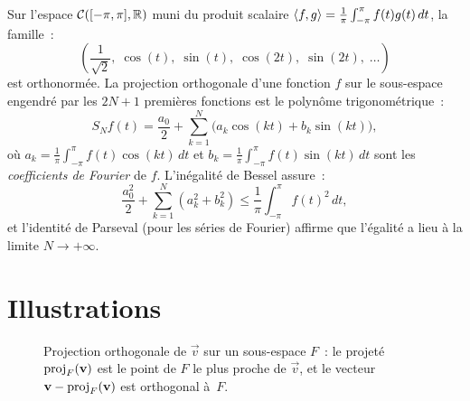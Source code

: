 Sur l'espace $\mathcal{C}([-\pi,\pi],{\mathbb{R}})$ muni du produit scalaire
$\langle f,g\rangle=\frac{1}{\pi}\int_{-\pi}^{\pi}f(t)g(t)\,dt$, la famille~:
\[
  \left(\frac{1}{\sqrt{2}},\;\cos(t),\;\sin(t),\;\cos(2t),\;
  \sin(2t),\;\ldots\right)
\]
est orthonormée. La projection orthogonale d'une fonction $f$ sur le
sous-espace engendré par les $2N+1$ premières fonctions est le
polynôme trigonométrique~:
\[
  S_N f(t)=\frac{a_0}{2}+\sum_{k=1}^N\bigl(a_k\cos(kt)
  +b_k\sin(kt)\bigr),
\]
où $a_k=\frac{1}{\pi}\int_{-\pi}^{\pi}f(t)\cos(kt)\,dt$ et
$b_k=\frac{1}{\pi}\int_{-\pi}^{\pi}f(t)\sin(kt)\,dt$ sont les
\emph{coefficients de Fourier} de $f$. L'inégalité de Bessel assure~:
\[
  \frac{a_0^2}{2}+\sum_{k=1}^N(a_k^2+b_k^2)
  \leq\frac{1}{\pi}\int_{-\pi}^{\pi}f(t)^2\,dt,
\]
et l'identité de Parseval (pour les séries de Fourier) affirme que
l'égalité a lieu à la limite $N\to+\infty$.

\section{Illustrations}\label{sec:illustrations-ps}

\begin{figure}[ht]
\centering
{}
\caption{Projection orthogonale de $\vec{v}$ sur un sous-espace $F$~:
  le projeté $\operatorname{proj}_F(\mathbf{v})$ est le point de $F$ le plus proche de
  $\vec{v}$, et le vecteur $\mathbf{v}-\operatorname{proj}_F(\mathbf{v})$ est orthogonal
  à~$F$.}
\label{fig:proj-ortho}
\end{figure}


